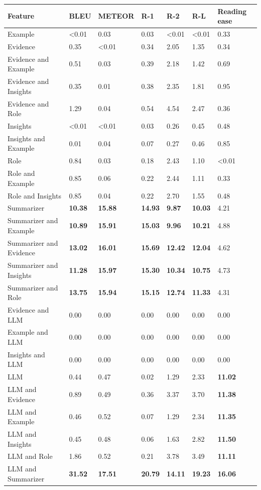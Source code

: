 \begin{tabular}{|l|l|l|l|l|l|l|}
\hline
\textbf{Feature} & BLEU & METEOR & R-1 & R-2 & R-L & Reading ease \\
 \hline
 Example & \textless{}0.01 & 0.03 & 0.03 & \textless{}0.01 & \textless{}0.01 & 0.33 \\
 \hline
 Evidence & 0.35 & \textless{}0.01 & 0.34 & 2.05 & 1.35 & 0.34 \\
 \hline
 Evidence and Example & 0.51 & 0.03 & 0.39 & 2.18 & 1.42 & 0.69 \\
 \hline
 Evidence and Insights & 0.35 & 0.01 & 0.38 & 2.35 & 1.81 & 0.95 \\
 \hline
 Evidence and Role & 1.29 & 0.04 & 0.54 & 4.54 & 2.47 & 0.36 \\
 \hline
 Insights & \textless{}0.01 & \textless{}0.01 & 0.03 & 0.26 & 0.45 & 0.48 \\
 \hline
 Insights and Example & 0.01 & 0.04 & 0.07 & 0.27 & 0.46 & 0.85 \\
 \hline
 Role & 0.84 & 0.03 & 0.18 & 2.43 & 1.10 & \textless{}0.01 \\
 \hline
 Role and Example & 0.85 & 0.06 & 0.22 & 2.44 & 1.11 & 0.33 \\
 \hline
 Role and Insights & 0.85 & 0.04 & 0.22 & 2.70 & 1.55 & 0.48 \\
 \hline
 Summarizer & \textbf{10.38} & \textbf{15.88} & \textbf{14.93} & \textbf{9.87} & \textbf{10.03} & 4.21 \\
 \hline
 Summarizer and Example & \textbf{10.89} & \textbf{15.91} & \textbf{15.03} & \textbf{9.96} & \textbf{10.21} & 4.88 \\
 \hline
 Summarizer and Evidence & \textbf{13.02} & \textbf{16.01} & \textbf{15.69} & \textbf{12.42} & \textbf{12.04} & 4.62 \\
 \hline
 Summarizer and Insights & \textbf{11.28} & \textbf{15.97} & \textbf{15.30} & \textbf{10.34} & \textbf{10.75} & 4.73 \\
 \hline
 Summarizer and Role & \textbf{13.75} & \textbf{15.94} & \textbf{15.15} & \textbf{12.74} & \textbf{11.33} & 4.31 \\
 \hline
 Evidence and LLM & 0.00 & 0.00 & 0.00 & 0.00 & 0.00 & 0.00 \\
 \hline
 Example and LLM & 0.00 & 0.00 & 0.00 & 0.00 & 0.00 & 0.00 \\
 \hline
 Insights and LLM & 0.00 & 0.00 & 0.00 & 0.00 & 0.00 & 0.00 \\
 \hline
 LLM & 0.44 & 0.47 & 0.02 & 1.29 & 2.33 & \textbf{11.02} \\
 \hline
 LLM and Evidence & 0.89 & 0.49 & 0.36 & 3.37 & 3.70 & \textbf{11.38} \\
 \hline
 LLM and Example & 0.46 & 0.52 & 0.07 & 1.29 & 2.34 & \textbf{11.35} \\
 \hline
 LLM and Insights & 0.45 & 0.48 & 0.06 & 1.63 & 2.82 & \textbf{11.50} \\
 \hline
 LLM and Role & 1.86 & 0.52 & 0.21 & 3.78 & 3.49 & \textbf{11.11} \\
 \hline
 LLM and Summarizer & \textbf{31.52} & \textbf{17.51} & \textbf{20.79} & \textbf{14.11} & \textbf{19.23} & \textbf{16.06} \\
\hline
\end{tabular}
